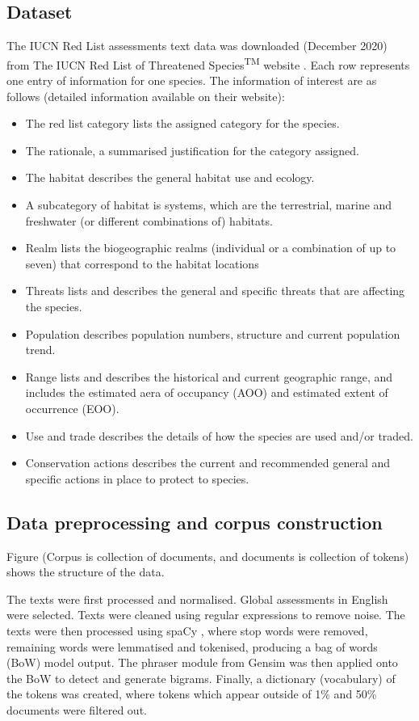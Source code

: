 \subsection{Dataset}

The IUCN Red List assessments text data was downloaded (December 2020) from The IUCN Red List of Threatened Species\textsuperscript{TM} website \parencite{iucn2021}. Each row represents one entry of information for one species. The information of interest are as follows (detailed information available on their website):
\begin{itemize}
    \item The red list category lists the assigned category for the species. 
    \item The rationale, a summarised justification for the category assigned. 
    \item The habitat describes the general habitat use and ecology. 
    \item A subcategory of habitat is systems, which are the terrestrial, marine and freshwater (or different combinations of) habitats.
    \item Realm lists the biogeographic realms (individual or a combination of up to seven) that correspond to the habitat locations
    \item Threats lists and describes the general and specific threats that are affecting the species. 
    \item Population describes population numbers, structure and current population trend. 
    \item Range lists and describes the historical and current geographic range, and includes the estimated aera of occupancy (AOO) and estimated extent of occurrence (EOO). 
    \item Use and trade describes the details of how the species are used and/or traded.
    \item Conservation actions describes the current and recommended general and specific actions in place to protect to species. 
\end{itemize}

\subsection{Data preprocessing and corpus construction}

Figure (Corpus is collection of documents, and documents is collection of tokens) shows the structure of the data. 

The texts were first processed and normalised. Global assessments in English were selected. Texts were cleaned using regular expressions to remove noise. The texts were then processed using spaCy \parencite{spacy}, where stop words were removed, remaining words were lemmatised and tokenised, producing a bag of words (BoW) model output. The phraser module from Gensim \parencite{rehurek_lrec} was then applied onto the BoW to detect and generate bigrams. Finally, a dictionary (vocabulary) of the tokens was created, where tokens which appear outside of 1\% and 50\% documents were filtered out. 

